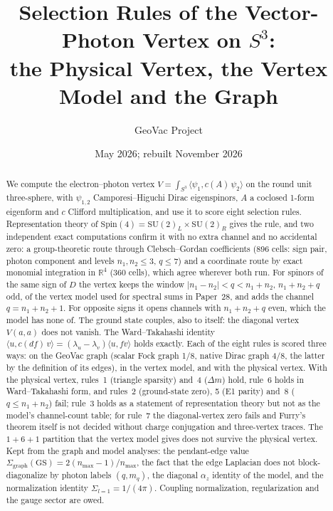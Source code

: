 \documentclass[11pt]{article}
\title{Selection Rules of the Vector-Photon Vertex on $S^3$:\\
the Physical Vertex, the Vertex Model and the Graph}
\author{GeoVac Project}
\date{May 2026; rebuilt November 2026}
\begin{document}
\maketitle

\begin{abstract}
We compute the electron--photon vertex
$V = \int_{S^3} \langle \psi_1, c(A)\,\psi_2 \rangle$ on the round unit
three-sphere, with $\psi_{1,2}$ Camporesi--Higuchi Dirac eigenspinors,
$A$ a coclosed 1-form eigenform and $c$ Clifford multiplication, and
use it to score eight selection rules.  Representation theory of
$\mathrm{Spin}(4) = \mathrm{SU}(2)_L \times \mathrm{SU}(2)_R$ gives the
rule, and two independent exact computations confirm it with no extra
channel and no accidental zero: a group-theoretic route through
Clebsch--Gordan coefficients (896 cells: sign pair, photon component and
levels $n_1, n_2 \le 3$, $q \le 7$) and a coordinate route by exact
monomial integration in $\mathbb{R}^4$ (360 cells), which agree wherever
both run.  For spinors of the same sign of $D$ the vertex keeps the
window $|n_1 - n_2| < q < n_1 + n_2$, $n_1 + n_2 + q$ odd, of the vertex
model used for spectral sums in Paper~28, and adds the channel
$q = n_1 + n_2 + 1$.  For opposite signs it opens channels with
$n_1 + n_2 + q$ even, which the model has none of.  The ground state
couples, also to itself: the diagonal vertex $V(a, a)$ does not vanish.
The Ward--Takahashi identity
$\langle u, c(df)\,v \rangle = (\lambda_u - \lambda_v)\langle u, f v\rangle$
holds exactly.  Each of the eight rules is scored three ways: on the
GeoVac graph (scalar Fock graph 1/8, native Dirac graph 4/8, the latter
by the definition of its edges), in the vertex model, and with the
physical vertex.  With the physical vertex, rules~1 (triangle sparsity)
and~4 ($\Delta m$) hold, rule~6 holds in Ward--Takahashi form, and
rules~2 (ground-state zero), 5 (E1 parity) and~8 ($q \le n_1 + n_2$)
fail; rule~3 holds as a statement of representation theory but not as
the model's channel-count table; for rule~7 the diagonal-vertex zero
fails and Furry's theorem itself is not decided without charge
conjugation and three-vertex traces.  The $1{+}6{+}1$ partition that
the vertex model gives does not survive the physical vertex.  Kept
from the graph and model analyses: the pendant-edge value
$\Sigma_{\mathrm{graph}}(\mathrm{GS}) = 2(n_{\max}-1)/n_{\max}$, the fact
that the edge Laplacian does not block-diagonalize by photon labels
$(q, m_q)$, the diagonal $\alpha_z$ identity of the model, and the
normalization identity $\Sigma_{l=1} = 1/(4\pi)$.  Coupling
normalization, regularization and the gauge sector are owed.
\end{abstract}
\end{document}
